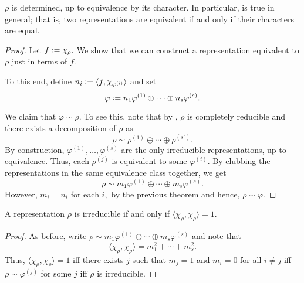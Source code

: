 \begin{cor} \label{cor:characbyequiv}
	$\rho$ is determined, up to equivalence by its character. In particular,  is true in general; that is, two representations are equivalent if and only if their characters are equal.
\end{cor}
\begin{proof} 
	Let $f \vcentcolon= \chi_\rho.$ We show that we can construct a representation equivalent to $\rho$ just in terms of $f.$

	To this end, define $n_i \vcentcolon= \langle f, \chi_{\varphi^{(i)}}\rangle$ and set
	\begin{equation*} 
		\varphi \vcentcolon= n_1\varphi^{(1)} \oplus \cdots \oplus n_s\varphi^{(s)}.
	\end{equation*}

	We claim that $\varphi \sim \rho.$ To see this, note that by , $\rho$ is completely reducible and there exists a decomposition of $\rho$ as 
	\begin{equation*} 
		\rho \sim \rho^{(1)} \oplus \cdots \oplus \rho^{(s')}.
	\end{equation*}
	By construction, $\varphi^{(1)}, \ldots, \varphi^{(s)}$ are the only irreducible representations, up to equivalence. Thus, each $\rho^{(j)}$ is equivalent to some $\varphi^{(i)}.$ By clubbing the representations in the same equivalence class together, we get
	\begin{equation*} 
		\rho \sim m_1\varphi^{(1)} \oplus \cdots \oplus m_s\varphi^{(s)}.
	\end{equation*}
	However, $m_i = n_i$ for each $i,$ by the previous theorem and hence, $\rho \sim \varphi.$
\end{proof}

\begin{cor} \label{cor:irrediffnormone}
	A representation $\rho$ is irreducible if and only if $\langle \chi_\rho, \chi_\rho\rangle = 1.$
\end{cor}
\begin{proof} 
	As before, write $\rho \sim m_1\varphi^{(1)} \oplus \cdots \oplus m_s\varphi^{(s)}$ and note that 
	\begin{equation*} 
		\langle \chi_\rho, \chi_\rho\rangle = m_1^2 + \cdots + m_s^2.
	\end{equation*}
	Thus, $\langle \chi_\rho, \chi_\rho\rangle = 1$ iff there exists $j$ such that $m_j = 1$ and $m_i = 0$ for all $i \neq j$ iff $\rho \sim \varphi^{(j)}$ for some $j$ iff $\rho$ is irreducible.
\end{proof}

